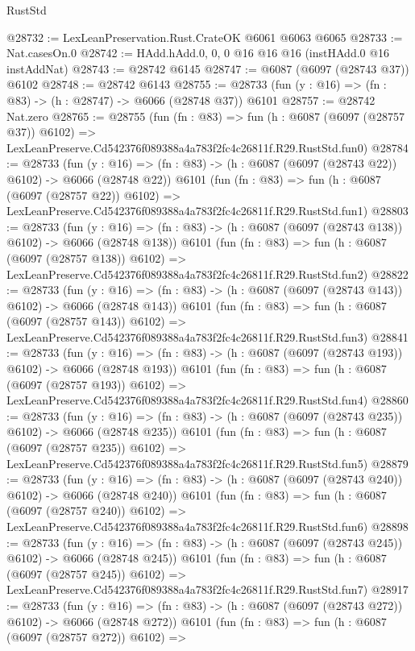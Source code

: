 \begin{lexlean}{RustStd}
\begin{coremodule}
@28732 := LexLeanPreservation.Rust.CrateOK @6061 @6063 @6065
@28733 := Nat.casesOn.{0}
@28742 := HAdd.hAdd.{0, 0, 0} @16 @16 @16 (instHAdd.{0} @16 instAddNat)
@28743 := @28742 @6145
@28747 := @6087 (@6097 (@28743 @37)) @6102
@28748 := @28742 @6143
@28755 := @28733 (fun (y : @16) => (fn : @83) -> (h : @28747) -> @6066 (@28748 @37)) @6101
@28757 := @28742 Nat.zero
@28765 := @28755
    (fun (fn : @83) =>
    fun (h : @6087 (@6097 (@28757 @37)) @6102) =>
    LexLeanPreserve.Cd542376f089388a4a783f2fc4c26811f.R29.RustStd.fun0)
@28784 := @28733
    (fun (y : @16) => (fn : @83) -> (h : @6087 (@6097 (@28743 @22)) @6102) -> @6066 (@28748 @22))
    @6101
    (fun (fn : @83) =>
    fun (h : @6087 (@6097 (@28757 @22)) @6102) =>
    LexLeanPreserve.Cd542376f089388a4a783f2fc4c26811f.R29.RustStd.fun1)
@28803 := @28733
    (fun (y : @16) => (fn : @83) -> (h : @6087 (@6097 (@28743 @138)) @6102) -> @6066 (@28748 @138))
    @6101
    (fun (fn : @83) =>
    fun (h : @6087 (@6097 (@28757 @138)) @6102) =>
    LexLeanPreserve.Cd542376f089388a4a783f2fc4c26811f.R29.RustStd.fun2)
@28822 := @28733
    (fun (y : @16) => (fn : @83) -> (h : @6087 (@6097 (@28743 @143)) @6102) -> @6066 (@28748 @143))
    @6101
    (fun (fn : @83) =>
    fun (h : @6087 (@6097 (@28757 @143)) @6102) =>
    LexLeanPreserve.Cd542376f089388a4a783f2fc4c26811f.R29.RustStd.fun3)
@28841 := @28733
    (fun (y : @16) => (fn : @83) -> (h : @6087 (@6097 (@28743 @193)) @6102) -> @6066 (@28748 @193))
    @6101
    (fun (fn : @83) =>
    fun (h : @6087 (@6097 (@28757 @193)) @6102) =>
    LexLeanPreserve.Cd542376f089388a4a783f2fc4c26811f.R29.RustStd.fun4)
@28860 := @28733
    (fun (y : @16) => (fn : @83) -> (h : @6087 (@6097 (@28743 @235)) @6102) -> @6066 (@28748 @235))
    @6101
    (fun (fn : @83) =>
    fun (h : @6087 (@6097 (@28757 @235)) @6102) =>
    LexLeanPreserve.Cd542376f089388a4a783f2fc4c26811f.R29.RustStd.fun5)
@28879 := @28733
    (fun (y : @16) => (fn : @83) -> (h : @6087 (@6097 (@28743 @240)) @6102) -> @6066 (@28748 @240))
    @6101
    (fun (fn : @83) =>
    fun (h : @6087 (@6097 (@28757 @240)) @6102) =>
    LexLeanPreserve.Cd542376f089388a4a783f2fc4c26811f.R29.RustStd.fun6)
@28898 := @28733
    (fun (y : @16) => (fn : @83) -> (h : @6087 (@6097 (@28743 @245)) @6102) -> @6066 (@28748 @245))
    @6101
    (fun (fn : @83) =>
    fun (h : @6087 (@6097 (@28757 @245)) @6102) =>
    LexLeanPreserve.Cd542376f089388a4a783f2fc4c26811f.R29.RustStd.fun7)
@28917 := @28733
    (fun (y : @16) => (fn : @83) -> (h : @6087 (@6097 (@28743 @272)) @6102) -> @6066 (@28748 @272))
    @6101
    (fun (fn : @83) =>
    fun (h : @6087 (@6097 (@28757 @272)) @6102) =>

\end{coremodule}
\end{lexlean}
